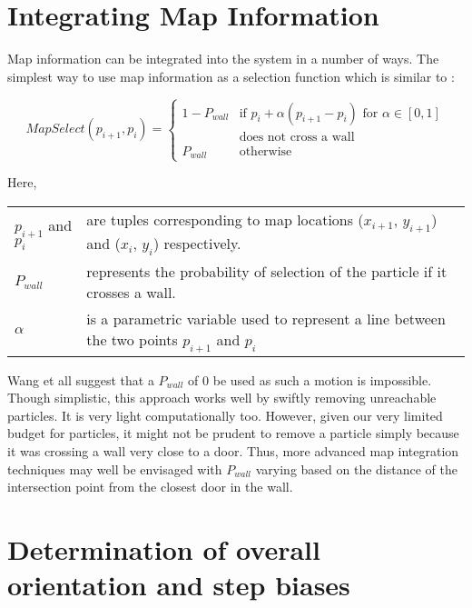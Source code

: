 \documentclass[10pt,journal,letterpaper,compsoc]{IEEEtran}
\begin{document}
\section{Integrating Map Information}

Map information can be integrated into the system in a number 
of ways. The simplest way to use map information as a selection 
function which is similar to \cite{Wang}:

\begin{equation}\label{eq:select}
MapSelect(p_{i+1}, p_i) = \begin{cases}1 - P_{wall} & \text{if $p_i + \alpha (p_{i+1} - p_i)$ for $\alpha \in [0,1]$} \\
                                                    & \text{does not cross a wall}\\
                                    P_{wall} & \text{otherwise}
                          \end{cases}
\end{equation}

Here,\\
\begin{tabular}{p{1.5in} p{3.5in}}
$p_{i+1}$ and $p_i$ &   are tuples corresponding to map locations ($x_{i+1}$, $y_{i+1}$) and ($x_i$, $y_i$) respectively. \\
$P_{wall}$ &   represents the probability of selection of the particle if it crosses a wall. \\
$\alpha$ & is a parametric variable used to represent a line between the two points $p_{i+1}$ and $p_i$ \\
\end{tabular}

Wang et all\cite{Wang} suggest that a $P_{wall}$ of 0 be used as such a motion
is impossible. Though simplistic, this approach works well by swiftly removing
unreachable particles. It is very light computationally too. However, given our
very limited budget for particles, it might not be prudent to remove a particle
simply because it was crossing a wall very close to a door. Thus, more advanced
map integration techniques may well be envisaged with $P_{wall}$ varying based
on the distance of the intersection point from the closest door in the wall. 

\section{Determination of overall orientation and step biases\label{sec:overall_bias}}
\end{document}
